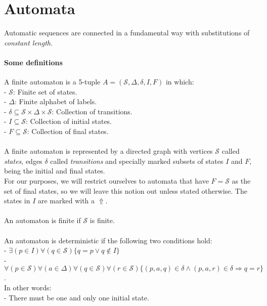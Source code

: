 \documentclass{article}
\begin{document}
\newcommand{\qed}{$\blacksquare$}

\section*{Automata}
Automatic sequences are connected in a fundamental way with substitutions of
\emph{constant length}.

\paragraph{Some definitions}
A finite automaton is a 5-tuple $A = (\mathcal{S}, \Delta, \delta, I, F)$ 
in which:\\
- $\mathcal{S}$: Finite set of states.\\
- $\Delta$: Finite alphabet of labels.\\
- $\delta \subseteq \mathcal{S} \times \Delta \times \mathcal{S}$: 
Collection of transitions.\\
- $I \subseteq \mathcal{S}$: Collection of initial states.\\
- $F \subseteq \mathcal{S}$: Collection of final states.\\
\\                                             
A finite automaton is represented by a directed graph with vertices 
$\mathcal{S}$ called \emph{states}, edges $\delta$ called \emph{transitions}
and specially marked subsets of states $I$ and $F$, being the initial and final
states.\\
For our purposes, we will restrict ourselves to automata that have 
$F = \mathcal{S}$ as the set of final states, so we will leave this notion 
out unless stated otherwise. The states in $I$ are marked with a $\Uparrow$.\\
\\
An automaton is finite if $\mathcal{S}$ is finite.\\
\\
An automaton is deterministic if the following two conditions hold:\\
- $\exists (p \in I) \forall (q  \in \mathcal{S}) 
\{q = p \lor q \notin I\}$\\
- $\forall (p \in \mathcal{S}) \forall (a \in \Delta) 
\forall (q \in \mathcal{S}) \forall (r \in \mathcal{S}) 
\{(p, a, q) \in \delta \land (p, a, r) \in \delta \Rightarrow q = r\}$.\\
In other words:\\
- There must be one and only one initial state.\\
\end{document}
